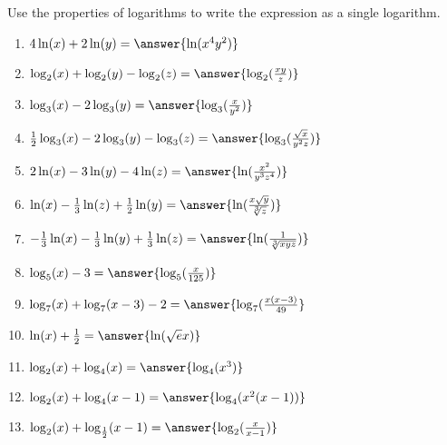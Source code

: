 \documentclass{ximera}
\author{Carl Stitz \and Jeff Zeager \and Bart Snapp \and Matthew Carr}
\begin{document}
\begin{exercise}






Use the properties of logarithms to write the expression as a single
logarithm. 

\begin{enumerate}
\item $4\ln(x) + 2\ln(y)=\answer{\ln(x^4y^2)}$ \label{combinelogfirst}
\item $\log_{2}(x) + \log_{2}(y) - \log_{2}(z)=\answer{\log_{2}(\frac{xy}{z})}$
\item $\log_{3}(x) - 2 \log_{3}(y)=\answer{\log_{3}(\frac{x}{y^2})}$
\item $\frac{1}{2}\log_{3}(x) - 2\log_{3}(y) - \log_{3}(z)=\answer{\log_{3}(\frac{\sqrt{x}}{y^2 z})}$
\item $2 \ln(x) -3 \ln(y) - 4\ln(z)=\answer{\ln(\frac{x^2}{y^3z^4})}$
\item $\ln(x) - \frac{1}{3} \ln(z) + \frac{1}{2} \ln(y)=\answer{\ln(\frac{x\sqrt{y}}{\sqrt[3]{z}})}$
\item $-\frac{1}{3} \ln(x) - \frac{1}{3}\ln(y) + \frac{1}{3} \ln(z)=\answer{\ln(\frac{1}{\sqrt[3]{xyz}})}$
\item $\log_{5}(x) - 3=\answer{\log_{5}(\frac{x}{125})}$
\item $\log_{7}(x) + \log_{7}(x - 3) - 2=\answer{\log_{7}(\frac{x(x-3)}{49}}$
\item $\ln(x) + \frac{1}{2}=\answer{\ln(\sqrt{e}x)}$ 
\item $\log_{2}(x) + \log_{4}(x)=\answer{\log_{4}(x^{3})}$ 
\item $\log_{2}(x) + \log_{4}(x-1)=\answer{\log_{4}(x^2(x-1))}$
\item $\log_{2}(x) + \log_{\frac{1}{2}}(x - 1)=\answer{\log_{2}(\frac{x}{x-1})}$ \label{combineloglast}
\end{enumerate}

\end{exercise}
\end{document}
